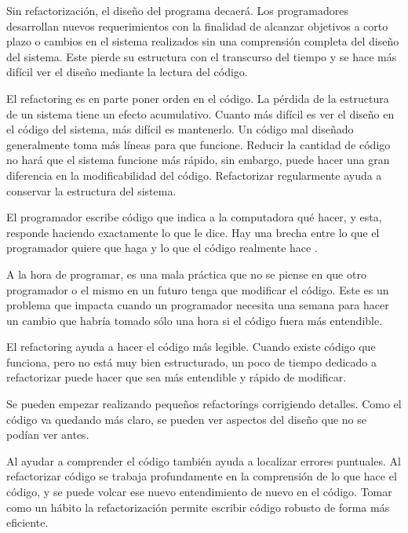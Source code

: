 \begin{enumerate}[label=\textbf{\arabic*}.]
	
	Sin refactorización, el diseño del programa decaerá. Los programadores desarrollan nuevos
	requerimientos con la finalidad de alcanzar objetivos a corto plazo o cambios en el sistema
	realizados sin una comprensión completa del diseño del sistema. Este pierde su estructura con
	el transcurso del tiempo y se hace más difícil ver el diseño mediante la lectura del código.
	
	El refactoring es en parte poner orden en el código. La pérdida de la estructura de un sistema
	tiene un efecto acumulativo. Cuanto más difícil es ver el diseño en el código del sistema, más
	difícil es mantenerlo. Un código mal diseñado generalmente toma más líneas para que
	funcione. Reducir la cantidad de código no hará que el sistema funcione más rápido, sin
	embargo, puede hacer una gran diferencia en la modificabilidad del código. Refactorizar
	regularmente ayuda a conservar la estructura del sistema.
	
	
	El programador escribe código que indica a la computadora qué hacer, y esta, responde
	haciendo exactamente lo que le dice. Hay una brecha entre lo que el programador quiere que
	haga y lo que el código realmente hace \cite{REF03}.
	
	A la hora de programar, es una mala práctica que no se piense en que otro programador o el
	mismo en un futuro tenga que modificar el código. Este es un problema que impacta cuando un
	programador necesita una semana para hacer un cambio que habría tomado sólo una hora si el
	código fuera más entendible.
	
	El refactoring ayuda a hacer el código más legible. Cuando existe código que funciona, pero
	no está muy bien estructurado, un poco de tiempo dedicado a refactorizar puede hacer que sea
	más entendible y rápido de modificar.
	
	Se pueden empezar realizando pequeños refactorings corrigiendo detalles. Como el código
	va quedando más claro, se pueden ver aspectos del diseño que no se podían ver antes. 
	
	
	Al ayudar a comprender el código también ayuda a localizar errores puntuales. Al refactorizar
	código se trabaja profundamente en la comprensión de lo que hace el código, y se puede
	volcar ese nuevo entendimiento de nuevo en el código. Tomar como un hábito la refactorización
	permite escribir código robusto de forma más eficiente.

\end{enumerate}

